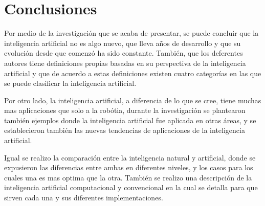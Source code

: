 \section{Conclusiones}
Por medio de la investigación que se acaba de presentar, se puede concluir que la inteligencia artificial no es algo nuevo, que lleva años de desarrollo y que su evolución desde que comenzó ha sido constante. También, que los deferentes autores tiene definiciones propias basadas en su perspectiva de la inteligencia artificial y que de acuerdo a estas definiciones existen cuatro categorías en las que se puede clasificar la inteligencia artificial.

Por otro lado, la inteligencia artificial, a diferencia de lo que se cree, tiene muchas mas aplicaciones que solo a la robótia, durante la investigación se plantearon también ejemplos donde la inteligencia artificial fue aplicada en otras áreas, y se establecieron también las nuevas tendencias de aplicaciones de la inteligencia artificial.

Igual se realizo la comparación entre la inteligencia natural y artificial, donde se expusieron las diferencias entre ambas en diferentes niveles, y los casos para los cuales una es mas optima que la otra. También se realizo una descripción de la inteligencia artificial computacional y convencional en la cual se detalla para que sirven cada una y sus diferentes implementaciones.